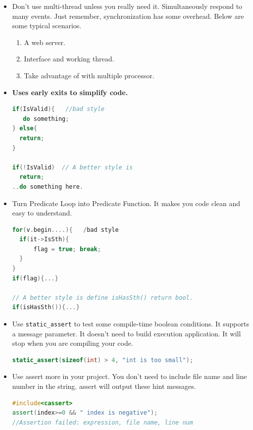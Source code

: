 \documentclass[a4paper,12pt,twoside]{book}
\begin{document}
\begin{itemize}
\item Don't use multi-thread unless you really need it. Simultaneously respond to many events. Just remember, synchronization has some overhead. Below are some typical scenarios.
\begin{enumerate}
\item A web server.
\item Interface and working thread.
\item Take advantage of with multiple processor.
\end{enumerate}

\item \textbf{Uses early exits to simplify code.}

\begin{lstlisting}[frame=single, language=c++]
if(IsValid){   //bad style
   do something;
} else{
  return;
}

if(!IsValid)  // A better style is
  return;
..do something here.
\end{lstlisting}

\item Turn Predicate Loop into Predicate Function. It makes you code clean and easy to understand.

\begin{lstlisting}[frame=single, language=c++]
for(v.begin....){   /bad style
  if(it->IsSth){
      flag = true; break;
  }
}
if(flag){...}

// A better style is define isHasSth() return bool.
if(isHasSth()){...}
\end{lstlisting}

\item Use \texttt{static\_assert} to test some compile-time boolean conditions. It supports a message parameter. It doesn't need to build execution application. It will stop when you are compiling your code. 
\begin{lstlisting}[frame=single, language=c++]
static_assert(sizeof(int) > 4, "int is too small");
\end{lstlisting}

\item Use assert more in your project. You don't need to include file name and line number in the string. assert will output these hint messages.
\begin{lstlisting}[frame=single, language=c++]
#include<cassert>
assert(index>=0 && " index is negative");
//Assertion failed: expression, file name, line num
\end{lstlisting}


\end{itemize}
\end{document}
